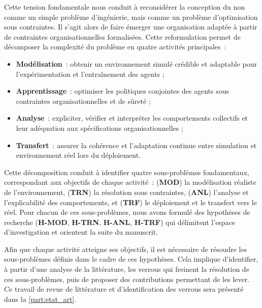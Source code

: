 Cette tension fondamentale nous conduit à reconsidérer la conception du  non comme un simple problème d'ingénierie, mais comme un problème d'optimisation sous contraintes. Il s'agit alors de faire émerger une organisation adaptée à partir de contraintes organisationnelles formalisées. Cette reformulation permet de décomposer la complexité du problème en quatre activités principales~:
\begin{itemize}
  \item \textbf{Modélisation}~: obtenir un environnement simulé crédible et adaptable pour l'expérimentation et l'entraînement des agents ;
  \item \textbf{Apprentissage}~: optimiser les politiques conjointes des agents sous contraintes organisationnelles et de sûreté ;
  \item \textbf{Analyse}~: expliciter, vérifier et interpréter les comportements collectifs et leur adéquation aux spécifications organisationnelles ;
  \item \textbf{Transfert}~: assurer la cohérence et l'adaptation continue entre simulation et environnement réel lors du déploiement.
\end{itemize}
Cette décomposition conduit à identifier quatre sous-problèmes fondamentaux, correspondant aux objectifs de chaque activité~: (\textbf{MOD}) la modélisation réaliste de l'environnement, (\textbf{TRN}) la résolution sous contraintes, (\textbf{ANL}) l'analyse et l'explicabilité des comportements, et (\textbf{TRF}) le déploiement et le transfert vers le réel. Pour chacun de ces sous-problèmes, nous avons formulé des hypothèses de recherche (\textbf{H-MOD}, \textbf{H-TRN}, \textbf{H-ANL}, \textbf{H-TRF}) qui délimitent l'espace d'investigation et orientent la suite du manuscrit.

Afin que chaque activité atteigne ses objectifs, il est nécessaire de résoudre les sous-problèmes définis dans le cadre de ces hypothèses. Cela implique d'identifier, à partir d'une analyse de la littérature, les verrous qui freinent la résolution de ces sous-problèmes, puis de proposer des contributions permettant de les lever. Ce travail de revue de littérature et d'identification des verrous sera présenté dans la \autoref{part:etat_art}.

